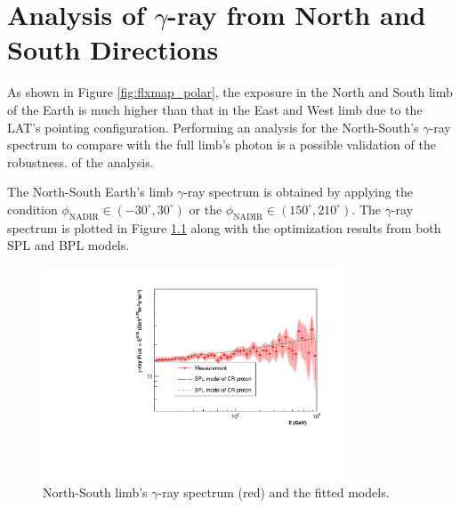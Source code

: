 \chapter{Analysis of $\gamma$-ray from North and South Directions}
\label{appendix:ns_analysis}


As shown in Figure \ref{fig:flxmap_polar},
the exposure in the North and South limb of
the Earth is much higher than that in the East and West limb due
to the LAT's pointing configuration.
Performing an analysis for the North-South's $\gamma$-ray spectrum 
to compare with the full limb's photon
is a possible validation of the robustness.
of the analysis.

The North-South Earth's limb $\gamma$-ray spectrum
is obtained by applying the condition
$\phi_\text{NADIR} \in (-30^{\circ}, 30^{\circ})$
or %
the $\phi_\text{NADIR} \in (150^{\circ}, 210^{\circ})$.
The $\gamma$-ray
spectrum is plotted in Figure \ref{fig:ns_fit_gamma} along with 
the optimization results from both SPL and BPL models.


\begin{figure}[h]
    \centering
    \includegraphics[width=0.8\textwidth]{appendix/ns_analysis/figures/fitted_result.pdf}
    \caption{North-South limb's $\gamma$-ray spectrum (red) and the fitted models.}
    \label{fig:ns_fit_gamma}
\end{figure}

